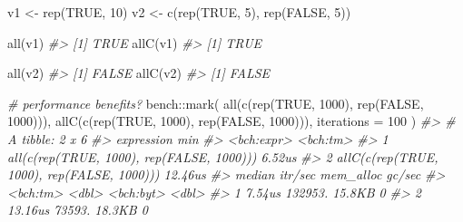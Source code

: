 \documentclass[
]{book}
\newenvironment{Shaded}{\begin{snugshade}}{\end{snugshade}}
\newcommand{\AttributeTok}[1]{\textcolor[rgb]{0.77,0.63,0.00}{#1}}
\newcommand{\CommentTok}[1]{\textcolor[rgb]{0.56,0.35,0.01}{\textit{#1}}}
\newcommand{\ConstantTok}[1]{\textcolor[rgb]{0.00,0.00,0.00}{#1}}
\newcommand{\DecValTok}[1]{\textcolor[rgb]{0.00,0.00,0.81}{#1}}
\newcommand{\FunctionTok}[1]{\textcolor[rgb]{0.00,0.00,0.00}{#1}}
\newcommand{\NormalTok}[1]{#1}
\newcommand{\OtherTok}[1]{\textcolor[rgb]{0.56,0.35,0.01}{#1}}
\newcommand{\SpecialCharTok}[1]{\textcolor[rgb]{0.00,0.00,0.00}{#1}}
\begin{document}
\begin{Shaded}
\begin{Highlighting}[]
\NormalTok{v1 }\OtherTok{\textless{}{-}} \FunctionTok{rep}\NormalTok{(}\ConstantTok{TRUE}\NormalTok{, }\DecValTok{10}\NormalTok{)}
\NormalTok{v2 }\OtherTok{\textless{}{-}} \FunctionTok{c}\NormalTok{(}\FunctionTok{rep}\NormalTok{(}\ConstantTok{TRUE}\NormalTok{, }\DecValTok{5}\NormalTok{), }\FunctionTok{rep}\NormalTok{(}\ConstantTok{FALSE}\NormalTok{, }\DecValTok{5}\NormalTok{))}

\FunctionTok{all}\NormalTok{(v1)}
\CommentTok{\#\textgreater{} [1] TRUE}
\FunctionTok{allC}\NormalTok{(v1)}
\CommentTok{\#\textgreater{} [1] TRUE}

\FunctionTok{all}\NormalTok{(v2)}
\CommentTok{\#\textgreater{} [1] FALSE}
\FunctionTok{allC}\NormalTok{(v2)}
\CommentTok{\#\textgreater{} [1] FALSE}

\CommentTok{\# performance benefits?}
\NormalTok{bench}\SpecialCharTok{::}\FunctionTok{mark}\NormalTok{(}
  \FunctionTok{all}\NormalTok{(}\FunctionTok{c}\NormalTok{(}\FunctionTok{rep}\NormalTok{(}\ConstantTok{TRUE}\NormalTok{, }\DecValTok{1000}\NormalTok{), }\FunctionTok{rep}\NormalTok{(}\ConstantTok{FALSE}\NormalTok{, }\DecValTok{1000}\NormalTok{))),}
  \FunctionTok{allC}\NormalTok{(}\FunctionTok{c}\NormalTok{(}\FunctionTok{rep}\NormalTok{(}\ConstantTok{TRUE}\NormalTok{, }\DecValTok{1000}\NormalTok{), }\FunctionTok{rep}\NormalTok{(}\ConstantTok{FALSE}\NormalTok{, }\DecValTok{1000}\NormalTok{))),}
  \AttributeTok{iterations =} \DecValTok{100}
\NormalTok{)}
\CommentTok{\#\textgreater{} \# A tibble: 2 x 6}
\CommentTok{\#\textgreater{}   expression                                      min}
\CommentTok{\#\textgreater{}   \textless{}bch:expr\textgreater{}                                 \textless{}bch:tm\textgreater{}}
\CommentTok{\#\textgreater{} 1 all(c(rep(TRUE, 1000), rep(FALSE, 1000)))    6.52us}
\CommentTok{\#\textgreater{} 2 allC(c(rep(TRUE, 1000), rep(FALSE, 1000)))  12.46us}
\CommentTok{\#\textgreater{}     median \textasciigrave{}itr/sec\textasciigrave{} mem\_alloc \textasciigrave{}gc/sec\textasciigrave{}}
\CommentTok{\#\textgreater{}   \textless{}bch:tm\textgreater{}     \textless{}dbl\textgreater{} \textless{}bch:byt\textgreater{}    \textless{}dbl\textgreater{}}
\CommentTok{\#\textgreater{} 1   7.54us   132953.    15.8KB        0}
\CommentTok{\#\textgreater{} 2  13.16us    73593.    18.3KB        0}
\end{Highlighting}
\end{Shaded}
\end{document}
